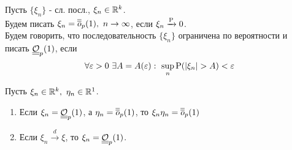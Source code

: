\begin{remark}
    Пусть $\{\xi_n\}$ - сл. посл., $\xi_n\in\R^k$. \\
    Будем писать $\xi_n=\littleO_p(1),\ n\rightarrow\infty$, если $\xi_n\xrightarrow{\P}0$. \\
    Будем говорить, что последовательность $\{\xi_n\}$ ограничена по вероятности и писать $\bigO_p(1)$, если
    \[\forall\eps>0\ \exists A=A(\eps):\ \sup_n\P(\left\lvert \xi_n\right\rvert >A)<\eps\]
\end{remark}
\begin{task} Пусть $\xi_n\in\R^k,\ \eta_n\in\R^1$.
    \begin{enumerate}
        \item Если $\xi_n=\bigO_p(1)$, а $\eta_n=\littleO_p(1)$, то $\xi_n\eta_n=\littleO_p(1)$
        \item Если $\xi_n\xrightarrow{d}\xi$, то $\xi_n=\bigO_p(1)$.
    \end{enumerate}
\end{task}
